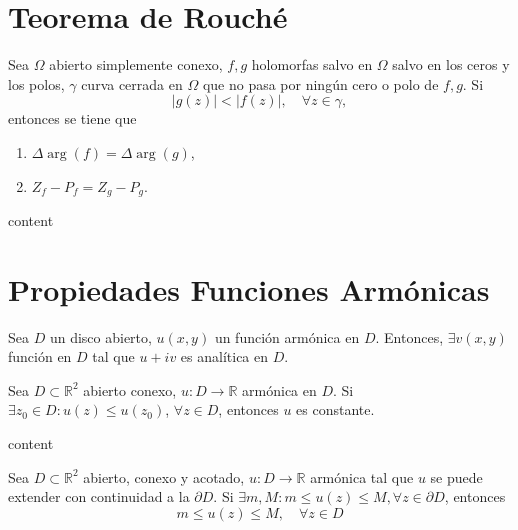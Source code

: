 \section{Teorema de Rouché}

\begin{theo}[Rouche]
  Sea $\Omega$ abierto simplemente conexo, $f,g$ holomorfas salvo en $\Omega$ salvo en los ceros y los polos, $\gamma$ curva cerrada en $\Omega$ que no pasa por ningún cero o polo de $f,g$. Si
  \[ 
    | g(z) | < | f(z) |, \quad \forall z \in \gamma,
  \] 
  entonces se tiene que
  \begin{enumerate}[label=(\roman*)]
    \item $\Delta \arg(f) = \Delta \arg(g)$,
    \item $Z_{f} - P_{f} = Z_{g} - P_{g}$.
  \end{enumerate}
\end{theo}

\begin{dem}
  content
\end{dem}

\section{Propiedades Funciones Armónicas}

\begin{prop}
  Sea $D$ un disco abierto, $u(x,y)$ un función armónica en $D$. Entonces, $\exists v(x,y)$ función en $D$ tal que $u + i v$ es analítica en $D$.
\end{prop}

\begin{theo}
  Sea $D \subset \mathbb{R}^{2}$ abierto conexo, $u : D \to \mathbb{R}$ armónica en $D$. Si $\exists z_{0} \in D : u(z) \leq u(z_{0})$, $\forall z \in D$, entonces $u$ es constante.
\end{theo}

\begin{dem}
  content
\end{dem}

\begin{theo} 
  Sea $D \subset \mathbb{R}^{2}$ abierto, conexo y acotado, $u : D \to \mathbb{R}$ armónica tal que $u$ se puede extender con continuidad a la $\partial{D}$. Si $\exists m, M : m \leq u(z) \leq M, \forall z \in \partial{D}$, entonces
  \[ 
    m \leq u(z) \leq M, \quad \forall z \in D 
  \] 
\end{theo}
